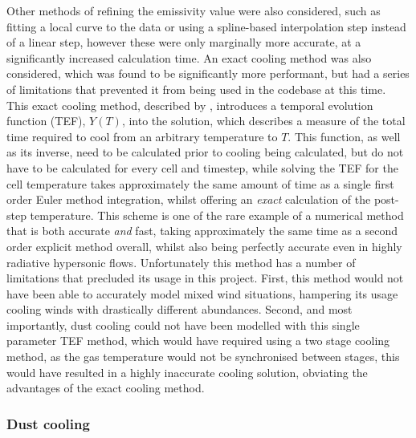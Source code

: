 Other methods of refining the emissivity value were also considered, such as fitting a local curve to the data or using a spline-based interpolation step instead of a linear step, however these were only marginally more accurate, at a significantly increased calculation time. 
An exact cooling method was also considered, which was found to be significantly more performant, but had a series of limitations that prevented it from being used in the codebase at this time.
This exact cooling method, described by \textcite{townsendExactIntegrationScheme2009}, introduces a temporal evolution function (TEF), $Y(T)$, into the solution, which describes a measure of the total time required to cool from an arbitrary temperature to $T$.
This function, as well as its inverse, need to be calculated prior to cooling being calculated, but do not have to be calculated for every cell and timestep, while solving the TEF for the cell temperature takes approximately the same amount of time as a single first order Euler method integration, whilst offering an \textit{exact} calculation of the post-step temperature.
This scheme is one of the rare example of a numerical method that is both accurate \textit{and} fast, taking approximately the same time as a second order explicit method overall, whilst also being perfectly accurate even in highly radiative hypersonic flows.
Unfortunately this method has a number of limitations that precluded its usage in this project.
First, this method would not have been able to accurately model mixed wind situations, hampering its usage cooling winds with drastically different abundances.
Second, and most importantly, dust cooling could not have been modelled with this single parameter TEF method, which would have required using a two stage cooling method, as the gas temperature would not be synchronised between stages, this would have resulted in a highly inaccurate cooling solution, obviating the advantages of the exact cooling method.

\subsubsection{Dust cooling}
\label{sec:dustcoolingmodel}


